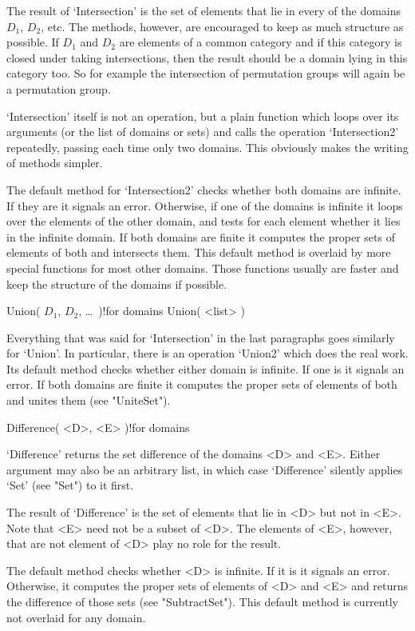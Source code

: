 The result of `Intersection' is the set of elements  that lie in every of
the domains  $D_1$, $D_2$, etc.  The methods, however,  are encouraged to
keep as much structure as possible. If $D_1$ and $D_2$  are elements of a
common   category   and if  this    category  is   closed under    taking
intersections, then the result should be  a domain lying in this category
too. So for example the intersection  of permutation groups will again be
a permutation group.

`Intersection' itself is not  an  operation, but  a plain function  which
loops over its  arguments (or the list of  domains or sets) and calls the
operation `Intersection2' repeatedly, passing each time only two domains.
This obviously makes the writing of methods simpler.

The default  method for `Intersection2' checks   whether both domains are
infinite.  If they are  it  signals an error.  Otherwise,  if one of  the
domains is infinite it loops over  the elements of  the other domain, and
tests  for each element whether it  lies in the  infinite domain. If both
domains are finite it  computes the proper  sets of elements of both  and
intersects them.  This  default   method  is overlaid  by   more  special
functions for most other domains. Those  functions usually are faster and
keep the structure of the domains if possible.

\>Union( $D_1$, $D_2$, \dots\ )!{for domains}
\)Union( <list> )

Everything that  was said for `Intersection'  in the last paragraphs goes
similarly  for `Union'. In particular,    there is an operation  `Union2'
which does the real work. Its default method checks whether either domain
is infinite. If one is it signals an error. If both domains are finite it
computes the   proper sets  of   elements of both  and  unites  them (see
"UniteSet").

\>Difference( <D>, <E> )!{for domains}

`Difference'  returns the  set difference  of  the domains  <D> and  <E>.
Either argument may also be an arbitrary list, in which case `Difference'
silently applies `Set' (see "Set") to it first.

The result of `Difference' is the set of elements that lie in <D> but not
in <E>.  Note that <E> need not be a subset of <D>.  The elements of <E>,
however, that are not element of <D> play no role for the result.

The default method checks whether <D> is infinite. If it is it signals an
error. Otherwise, it computes the proper sets of elements  of <D> and <E>
and  returns   the difference of  those   sets  (see "SubtractSet"). This
default method is currently not overlaid for any domain.

